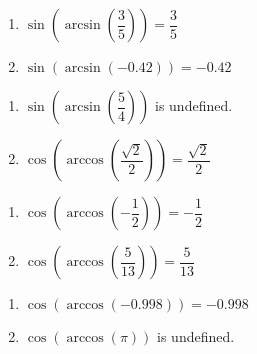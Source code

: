 \begin{multicols}{2}

\begin{enumerate}

\setcounter{enumi}{\value{HW}}

\item $\sin\left(\arcsin\left(\dfrac{3}{5}\right)\right) = \dfrac{3}{5}$
\item $\sin\left(\arcsin\left(-0.42\right)\right) = -0.42$ 

\setcounter{HW}{\value{enumi}}

\end{enumerate}

\end{multicols}

\begin{multicols}{2}

\begin{enumerate}

\setcounter{enumi}{\value{HW}}

\item $\sin\left(\arcsin\left(\dfrac{5}{4}\right)\right)$ is undefined. 
\item $\cos\left(\arccos\left(\dfrac{\sqrt{2}}{2}\right)\right) = \dfrac{\sqrt{2}}{2}$

\setcounter{HW}{\value{enumi}}

\end{enumerate}

\end{multicols}

\begin{multicols}{2}

\begin{enumerate}

\setcounter{enumi}{\value{HW}}

\item $\cos\left(\arccos\left(-\dfrac{1}{2}\right)\right) = -\dfrac{1}{2}$
\item $\cos\left(\arccos\left(\dfrac{5}{13}\right)\right) = \dfrac{5}{13}$

\setcounter{HW}{\value{enumi}}

\end{enumerate}

\end{multicols}

\begin{multicols}{2}

\begin{enumerate}

\setcounter{enumi}{\value{HW}}

\item $\cos\left(\arccos\left(-0.998\right)\right) = -0.998$
\item $\cos\left(\arccos\left(\pi \right)\right)$ is undefined.

\setcounter{HW}{\value{enumi}}

\end{enumerate}

\end{multicols}

